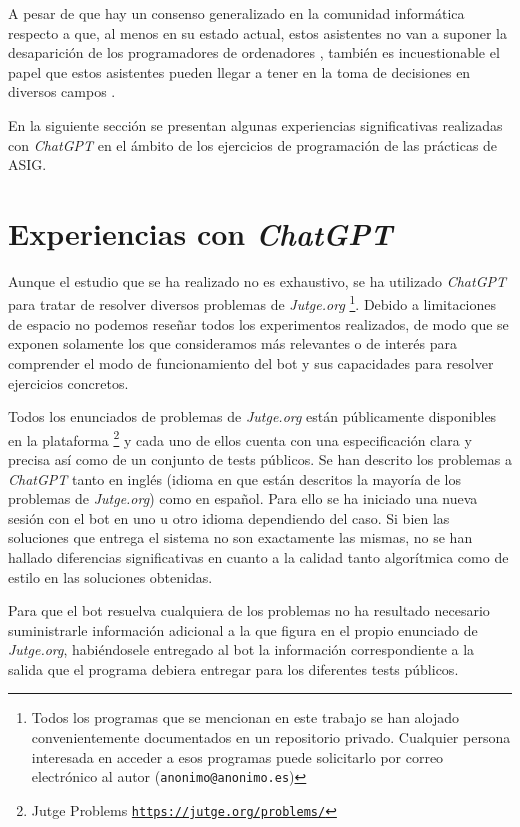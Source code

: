\documentclass[twocolumn,twoside,a4paper, 10pt]{article}
\newcommand{\jutge}{\textit{Jutge.org}{}}           %
\newcommand{\ChatGPT}{\textit{ChatGPT}{}}           %
\begin{document}
A pesar de que hay un consenso generalizado en la comunidad informática respecto a que, al menos en su estado
actual, estos asistentes no van a suponer la desaparición de los programadores de ordenadores
\cite{Castelvecchi:2022:ACaA}, 
también es incuestionable el papel que estos asistentes pueden llegar a tener en la toma de decisiones en
diversos campos 
\cite{Kung:2022:PCU}.


En la siguiente sección se presentan algunas experiencias significativas realizadas con \ChatGPT{} en el ámbito
de los ejercicios de programación de las prácticas de ASIG.
\section{Experiencias con \ChatGPT{}}
Aunque el estudio que se ha realizado no es exhaustivo, se ha utilizado \ChatGPT{} para tratar de resolver
diversos problemas de \jutge{}
\footnote{
Todos los programas que se mencionan en este trabajo se han alojado convenientemente documentados en un repositorio privado.
Cualquier persona interesada en acceder a esos programas puede solicitarlo por correo electrónico al autor 
(\texttt{anonimo@anonimo.es})
}. 
Debido a limitaciones de espacio no podemos reseñar todos los experimentos realizados, de modo que 
se exponen solamente los que consideramos más relevantes o de interés para comprender el modo de funcionamiento 
del bot y sus capacidades para resolver ejercicios concretos.

Todos los enunciados de problemas de \jutge{} están públicamente disponibles en la
plataforma 
\footnote{Jutge Problems \href{https://jutge.org/problems/}{\scriptsize{\texttt{https://jutge.org/problems/}}}}
y cada uno de ellos cuenta con una especificación clara y precisa así como de un conjunto de tests públicos.
Se han descrito los problemas a \ChatGPT{} tanto en inglés (idioma en que están descritos la mayoría de
los problemas de \jutge{}) como en español.
Para ello se ha iniciado una nueva sesión con el bot en uno u otro idioma dependiendo del caso.
Si bien las soluciones que entrega el sistema no son exactamente las mismas, no se han hallado diferencias
significativas en cuanto a la calidad tanto algorítmica como de estilo en las soluciones obtenidas.

Para que el bot resuelva cualquiera de los problemas no ha resultado necesario suministrarle información
adicional a la que figura en el propio enunciado de \jutge{}, habiéndosele entregado al bot la información
correspondiente a la salida que el programa debiera entregar para los diferentes tests públicos.
\end{document}

